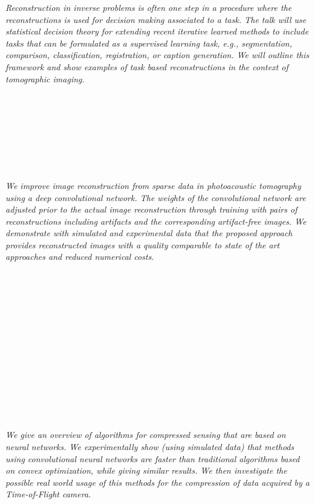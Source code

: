   \begin{multicols}{2}
      \textit{Reconstruction in inverse problems is often one step in a procedure where the reconstructions is used for decision making associated to a task. The talk will use statistical decision theory for extending recent iterative learned methods to include tasks that can be formulated as a supervised learning task, e.g., segmentation, comparison, classification, registration, or caption generation. We will outline this framework and show examples of task based reconstructions in the context of tomographic imaging.}\\
\\ 
        \\
        \\\\
        \\
        \\\\
\\
      \textit{We improve image reconstruction from sparse data in photoacoustic tomography using a deep convolutional network. The weights of the convolutional network are adjusted prior to the actual image reconstruction through training with pairs of reconstructions including artifacts and the corresponding artifact-free images. We demonstrate with simulated and experimental data that the proposed approach provides reconstructed images with a quality comparable to state of the art approaches and reduced numerical costs.}\\
\\ 
        \\
        \\\\
        \\
        \\\\
        \\
        \\\\
        \\
        \\\\
\\
      \textit{We give an overview of algorithms for compressed sensing that are based on neural networks. We experimentally show (using simulated data) that methods using convolutional neural networks are faster than traditional algorithms based on convex optimization, while giving similar results. We then investigate the possible real world usage of this methods for the compression of data acquired by a Time-of-Flight camera.}\\

\end{multicols}
